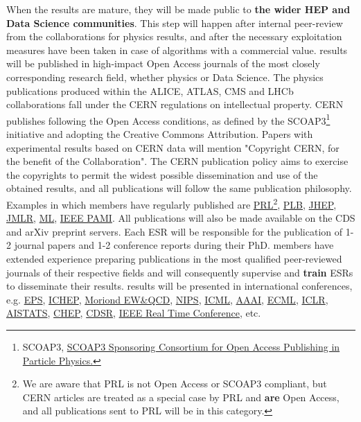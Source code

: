 When the results are mature, they will be
made public to \textbf{the wider HEP and Data Science communities}. 
This step will happen after internal peer-review from the collaborations for physics results,
and after the necessary exploitation measures have been taken 
in case of algorithms with a commercial value. 
\acronym results will be published in high-impact Open Access journals of
the most closely corresponding research field, 
whether physics or Data Science. 
The physics publications produced within the ALICE, ATLAS, CMS and
LHCb collaborations fall under the CERN regulations on intellectual
property. CERN publishes following the Open Access conditions, as
defined by the SCOAP3\footnote{SCOAP3, \href{http://scoap3.org/}{SCOAP3
    Sponsoring Consortium for Open Access Publishing in Particle
    Physics.}} initiative and adopting the Creative Commons
Attribution. Papers with experimental results based on CERN data will
mention "Copyright CERN, for the benefit of the  Collaboration".
The CERN publication policy aims to exercise the copyrights to permit
the widest possible dissemination and use of the obtained results, 
and all \acronym publications will follow the same publication philosophy.
Examples in which \acronym members have
regularly published are \href{http://journals.aps.org/prl/}{PRL}\footnote{We are aware that
  PRL is not Open Access or SCOAP3  compliant, but CERN articles are
  treated as a special case by PRL and \textbf{are} Open Access, and
  all \acronym publications sent to PRL will be in this category.},  
\href{http://www.journals.elsevier.com/physics-letters-b/}{PLB}, \href{http://jhep.sissa.it}{JHEP}, 
\href{http://jmlr.csail.mit.edu}{JMLR}, \href{http://www.springer.com/computer/ai/journal/10994}{ML}, \href{http://www.computer.org/web/tpami}{IEEE PAMI}.
All publications will also be made available on the CDS and arXiv
preprint servers. Each ESR will be responsible for the
publication of 1-2 journal papers and 1-2 conference reports during their PhD. 
\acronym members have extended experience preparing
publications in the most qualified peer-reviewed journals of their
respective fields and will consequently supervise and \textbf{train}
ESRs to disseminate their results.  
\acronym results will be presented in
international conferences, e.g.
\href{https://indico.cern.ch/event/577856/}{EPS},
\href{http://www.ichep2018.org}{ICHEP},
\href{http://moriond.in2p3.fr}{Moriond  EW\&QCD},
\href{http://nips.cc}{NIPS}, \href{http://icml.cc}{ICML}, \href{http://www.aaai.org/Conferences/IAAI/iaai15.php}{AAAI}, \href{http://www.ecmlpkdd2014.org}{ECML},
\href{https://sites.google.com/site/representationlearning2014/}{ICLR}, \href{http://www.aistats.org}{AISTATS}, \href{http://chep2018.org}{CHEP}, \href{http://cdsr.net/papers/}{CDSR}, 
\href{https://indico.cern.ch/event/543031/}{IEEE Real Time Conference}, etc. 

